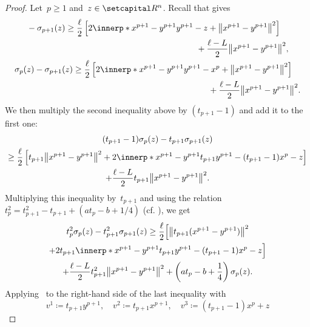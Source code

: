 \documentclass[../main]{subfiles}
\begin{document}
\begin{proof}
    Let~$p \ge 1$ and~$z \in \setR^n$.
    Recall that  gives
    \begin{gather}
        \begin{multlined}
        - \sigma_{p + 1}(z) \ge \frac{\ell}{2} \left[ 2 \innerp*{x^{p + 1} - y^{p + 1}}{y^{p + 1} - z} + \norm*{x^{p + 1} - y^{p + 1}}^2 \right] \\
        + \frac{\ell - L}{2} \norm*{x^{p + 1} - y^{p + 1}}^2,
        \end{multlined} \\
        \begin{multlined}
            \sigma_p(z) - \sigma_{p + 1}(z) \ge \frac{\ell}{2} \left[ 2 \innerp*{x^{p + 1} - y^{p + 1}}{y^{p + 1} - x^p} + \norm*{x^{p + 1} - y^{p + 1}}^2 \right] \\
            + \frac{\ell - L}{2} \norm*{x^{p + 1} - y^{p + 1}}^2
        .\end{multlined}
        \end{gather}
        We then multiply the second inequality above by $(t_{p + 1} - 1)$ and add it to the first one:
    \begin{multline}
        (t_{p + 1} - 1) \sigma_p(z) - t_{p + 1} \sigma_{p + 1}(z) \\
        \ge \frac{\ell}{2} \left[ t_{p + 1} \norm*{x^{p + 1} - y^{p + 1}}^2 + 2 \innerp*{x^{p + 1} - y^{p + 1}}{t_{p + 1} y^{p + 1} - (t_{p + 1} - 1)x^p - z} \right] \\
        + \frac{\ell - L}{2} t_{p + 1} \norm*{x^{p + 1} - y^{p + 1}}^2
    .\end{multline}
    Multiplying this inequality by~$t_{p + 1}$ and using the relation~$t_p^2 = t_{p + 1}^2 - t_{p + 1} + (a t_p - b + 1/4)$ (cf. ), we get
    \begin{multline}
        t_p^2 \sigma_p(z) - t_{p + 1}^2 \sigma_{p + 1}(z) \ge \frac{\ell}{2} \Bigl[ \norm*{t_{p + 1} (x^{p + 1} - y^{p + 1})}^2  \\
        + 2 t_{p + 1} \innerp*{x^{p + 1} - y^{p + 1}}{t_{p + 1} y^{p + 1} - (t_{p + 1} - 1)x^p - z} \Bigr] \\
        + \frac{\ell - L}{2} t_{p + 1}^2 \norm*{x^{p + 1} - y^{p + 1}}^2 + \left( a t_p - b + \frac{1}{4} \right) \sigma_p(z)
    .\end{multline}
    Applying~ to the right-hand side of the last inequality with
    \begin{equation}
        v^1 \coloneqq t_{p + 1} y^{p + 1}, \quad v^2 \coloneqq t_{p + 1} x^{p + 1}, \quad v^3 \coloneqq (t_{p + 1} - 1) x^p + z

\end{equation}
\end{proof}
\end{document}
